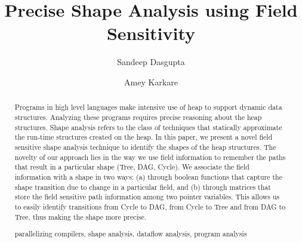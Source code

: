 \documentclass[runningheads,a4paper]{llncs}
\newcommand{\keywords}[1]{\par\addvspace\baselineskip
\noindent\keywordname\enspace\ignorespaces#1}
\begin{document}
\mainmatter  %

\title{Precise Shape Analysis using Field Sensitivity}


%
%
\author{Sandeep Dasgupta \and Amey Karkare}
%



\maketitle


\begin{abstract}
Programs in high level languages make intensive use of heap
to support dynamic data structures.  Analyzing these programs
requires precise reasoning about the heap structures. Shape
analysis refers to the class of techniques that statically
approximate the run-time structures created on the heap.  In
this paper, we present a novel field sensitive shape analysis
technique to identify the shapes of the heap structures.  The
novelty of our approach lies in the way we use field
information to remember the paths that result in a particular
shape (Tree, DAG, Cycle).  We associate the field information
with a shape in two ways: (a) through boolean functions that
capture the shape transition due to change in a particular
field, and (b) through matrices that store the field
sensitive path information among two pointer variables.  This
allows us to easily identify transitions from Cycle to DAG,
from Cycle to Tree and from DAG to Tree, thus making the
shape more precise.

\keywords{parallelizing compilers, shape analysis, dataflow analysis, program analysis}
\end{abstract}
\end{document}
